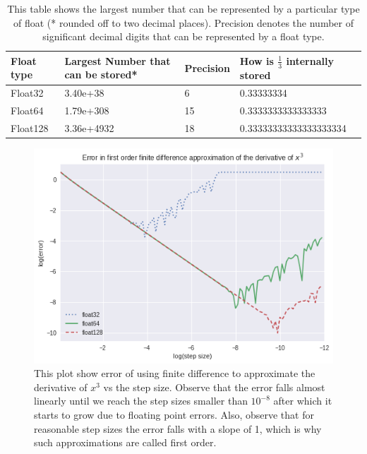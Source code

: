 \begin{table}
    \centering
    \begin{tabular}{||m{2cm} | m{3.2cm} | m{1.5cm} | m{4.5cm}||}
        \hline
        Float type & Largest Number that can be stored* & Precision & How is $\frac{1}{3}$ internally stored \\ [0.5ex]
        \hline\hline

        Float32    & 3.40e+38                           & 6         & 0.33333334                             \\

        Float64    & 1.79e+308                          & 15        & 0.3333333333333333                     \\

        Float128   & 3.36e+4932                         & 18        & 0.33333333333333333334                 \\ [1ex]
        \hline
    \end{tabular}
    \caption{This table shows the largest number that can be represented by a particular type of float (* rounded off to two decimal places). Precision denotes the number of significant decimal digits that can be represented by a float type.}
    \label{table:floats}
\end{table}



\begin{figure}[hbt!]
    \centering
    \includegraphics[width=\textwidth]{images/x^3_error_order1.png}
    \caption{This plot show error of using finite difference to approximate the derivative of $x^3$ vs the step size. Observe that the error falls almost linearly until we reach the step sizes smaller than $10^{-8}$ after which it starts to grow due to floating point errors. Also, observe that for reasonable step sizes the error falls with a slope of 1, which is why such approximations are called first order. }\label{fig:x^3_error_order1}
\end{figure}

